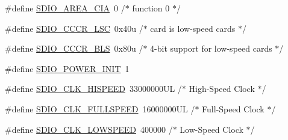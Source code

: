 \begin{DoxyCompactItemize}
\#define \hyperlink{group___s_d_i_o__18_x_x__43_x_x_ga618b5f21869d50e819000ef9377a8152}{S\+D\+I\+O\+\_\+\+A\+R\+E\+A\+\_\+\+C\+IA}~0			/$\ast$ function 0 $\ast$/
\item 
\#define \hyperlink{group___s_d_i_o__18_x_x__43_x_x_gab1e79e46eaea4a43810230d107ed09da}{S\+D\+I\+O\+\_\+\+C\+C\+C\+R\+\_\+\+L\+SC}~0x40u		/$\ast$ card is low-\/speed cards $\ast$/
\item 
\#define \hyperlink{group___s_d_i_o__18_x_x__43_x_x_gaab122ffdb55c066575c38ac3e402c620}{S\+D\+I\+O\+\_\+\+C\+C\+C\+R\+\_\+B\+LS}~0x80u		/$\ast$ 4-\/bit support for low-\/speed cards $\ast$/
\item 
\#define \hyperlink{group___s_d_i_o__18_x_x__43_x_x_ga5a20ad7b551a63146fb59ab17418a097}{S\+D\+I\+O\+\_\+\+P\+O\+W\+E\+R\+\_\+\+I\+N\+IT}~1
\item 
\#define \hyperlink{group___s_d_i_o__18_x_x__43_x_x_gaec2d2c3efcd5b586c08200fcde226286}{S\+D\+I\+O\+\_\+\+C\+L\+K\+\_\+\+H\+I\+S\+P\+E\+ED}~33000000\+U\+L    /$\ast$ High-\/\+Speed Clock	$\ast$/
\item 
\#define \hyperlink{group___s_d_i_o__18_x_x__43_x_x_ga5a1465ced1676ff1c5dc92ebacfc52eb}{S\+D\+I\+O\+\_\+\+C\+L\+K\+\_\+\+F\+U\+L\+L\+S\+P\+E\+ED}~16000000\+U\+L    /$\ast$ Full-\/\+Speed Clock	$\ast$/
\item 
\#define \hyperlink{group___s_d_i_o__18_x_x__43_x_x_gad8b898cc4b30fc31323109add873f8e7}{S\+D\+I\+O\+\_\+\+C\+L\+K\+\_\+\+L\+O\+W\+S\+P\+E\+ED}~400000        /$\ast$ Low-\/Speed Clock	$\ast$/
\end{DoxyCompactItemize}
